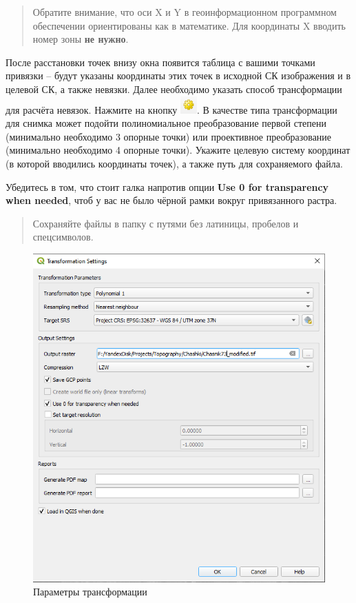 \documentclass[
  12pt,
]{book}
\begin{document}
\begin{quote}
Обратите внимание, что оси X и Y в геоинформационном программном обеспечении ориентированы как в математике. Для координаты X вводить номер зоны \textbf{не нужно}.
\end{quote}

После расстановки точек внизу окна появится таблица с вашими точками привязки -- будут указаны координаты этих точек в исходной СК изображения и в целевой СК, а также невязки. Далее необходимо указать способ трансформации для расчёта невязок. Нажмите на кнопку \includegraphics{images/Practice/Transformation_settings.png}. В качестве типа трансформации для снимка может подойти полиномиальное преобразование первой степени (минимально необходимо 3 опорные точки) или проективное преобразование (минимально необходимо 4 опорные точки). Укажите целевую систему координат (в которой вводились координаты точек), а также путь для сохраняемого файла.

Убедитесь в том, что стоит галка напротив опции \textbf{Use 0 for transparency when needed}, чтоб у вас не было чёрной рамки вокруг привязанного растра.

\begin{quote}
Сохраняйте файлы в папку с путями без латиницы, пробелов и спецсимволов.
\end{quote}

\begin{figure}
\centering
\includegraphics{images/Practice/Transformation_parameters.png}
\caption{Параметры трансформации}
\end{figure}
\end{document}
